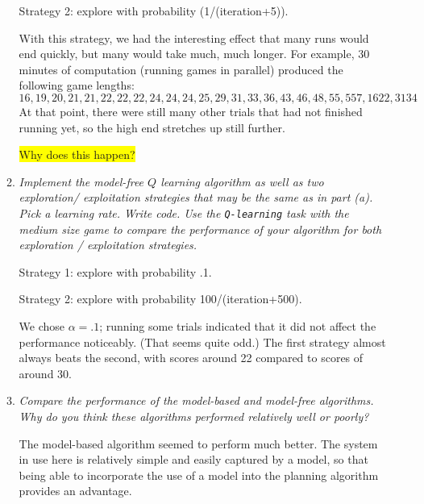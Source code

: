 \documentclass{article}
\newcommand{\edit}[1]{\colorbox{Yellow}{#1}}
\begin{document}
\begin{enumerate}
\begin{enumerate}
    Strategy 2: explore with probability (1/(iteration+5)).

    With this strategy, we had the interesting effect that many runs
    would end quickly, but many would take much, much longer. For
    example, 30 minutes of computation (running games in parallel)
    produced the following game lengths:
    \[16, 19, 20, 21, 21, 22, 22, 22, 24, 24, 24, 25, 29, 31, 33, 36, 43, 46, 48, 55, 557, 1622, 3134\]
    At that point, there were still many other trials that had not
    finished running yet, so the high end stretches up still further.

    \edit{Why does this happen?}

  \item \emph{Implement the model-free $Q$ learning algorithm as well
    as two exploration/ exploitation strategies that may be the same
    as in part (a). Pick a learning rate. Write code. Use the
    \texttt{Q-learning} task with the medium size game to compare the
    performance of your algorithm for both exploration / exploitation
    strategies.}

    Strategy 1: explore with probability .1.

    Strategy 2: explore with probability 100/(iteration+500).

    We chose $\alpha=.1$; running some trials indicated that it did
    not affect the performance noticeably. (That seems quite odd.) The
    first strategy almost always beats the second, with scores around
    22 compared to scores of around 30.

  \item \emph{Compare the performance of the model-based and
    model-free algorithms. Why do you think these algorithms performed
    relatively well or poorly?}

    The model-based algorithm seemed to perform much better. The
    system in use here is relatively simple and easily captured by a
    model, so that being able to incorporate the use of a model into
    the planning algorithm provides an advantage.

  \end{enumerate}

\end{enumerate}
\end{document}
